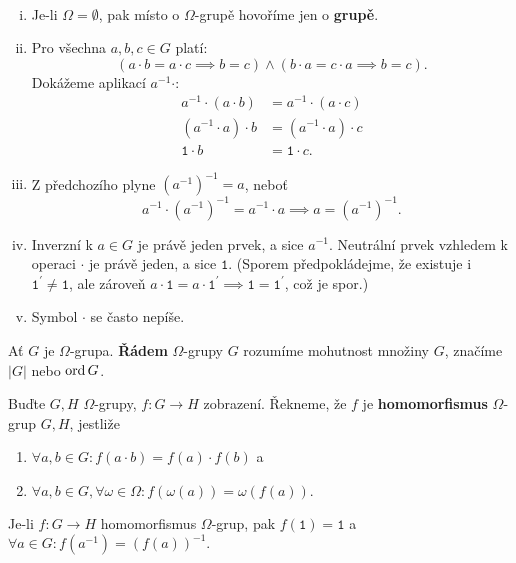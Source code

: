 \begin{poznamka}\,
\begin{enumerate}[i.]
	\item Je-li $\Omega = \emptyset$, pak místo o $\Omega$-grupě hovoříme jen o \textbf{grupě}.
	\item Pro všechna $a,b,c\in G$ platí:
	$$
	    (a\cdot b = a\cdot c \implies b=c) \land (b\cdot a= c\cdot a \implies b=c).
	$$
	Dokážeme aplikací $a^{-1}\cdot:$
	\begin{align*}
		a^{-1}\cdot(a\cdot b) &=a^{-1}\cdot(a\cdot c) \\
		(a^{-1}\cdot a)\cdot b &=(a^{-1}\cdot a)\cdot c \\
		\mathtt 1 \cdot b &=\mathtt 1 \cdot c.
	\end{align*}
	\item Z předchozího plyne $\left( a^{-1} \right )^{-1}=a $, neboť
	$$
	    a^{-1}\cdot \left( a^{-1} \right )^{-1} = a^{-1}\cdot a \implies a=\left( a^{-1} \right )^{-1}.
	$$
	\item Inverzní k $a\in G$ je právě jeden prvek, a sice $a^{-1}$. Neutrální prvek
	vzhledem k operaci $\cdot$ je právě jeden, a sice $\mathtt 1$. (Sporem předpokládejme, že existuje
	i $\mathtt 1^\prime\ne \mathtt 1$, ale zároveň $a\cdot \mathtt 1 = a\cdot\mathtt1^\prime\implies \mathtt 1 = \mathtt 1^\prime$,
	což je spor.)
	\item Symbol $\cdot$ se často nepíše.
\end{enumerate}
\end{poznamka}


\begin{definice}
	Ať $G$ je $\Omega$-grupa. \textbf{Řádem} $\Omega$-grupy $G$ rozumíme mohutnost množiny $G$, značíme
	$|G|$ nebo $\operatorname{ord} G$.
\end{definice}

\begin{definice}
	Buďte $G,H$ $\Omega$-grupy, $f:G\to H$ zobrazení. Řekneme, že $f$ je \textbf{homomorfismus}
	$\Omega$-grup $G,H$, jestliže
	\begin{enumerate}[$(i)$]
		\item $\forall a,b\in G: f(a\cdot b)=f(a)\cdot f(b)$ a
		\item $\forall a,b \in G, \forall \omega \in \Omega: f(\omega(a))=\omega(f(a)).$
\end{enumerate}
\end{definice}

\begin{lemma}\label{lemma11}
	Je-li $f:G\to H$ homomorfismus $\Omega$-grup, pak $f(\mathtt 1)= \mathtt 1$ a $\forall a\in G:f \left( a^{-1} \right ) =\left( f(a) \right )^{-1} $.
\end{lemma}

